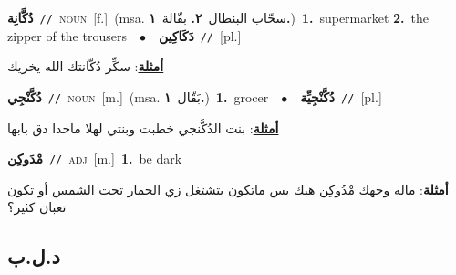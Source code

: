 \documentclass[10pt,a4paper,twoside]{article} %
\begin{document}
\begin{multicols}{2}
{\setlength\topsep{0pt}\textbf{\foreignlanguage{arabic}{دُكَّانِة}}\ {\color{gray}\texttt{//}\color{black}}\ \textsc{noun}\ [f.]\ \color{gray}(msa. \foreignlanguage{arabic}{سحّاب البنطال}~\foreignlanguage{arabic}{\textbf{٢.}}  \foreignlanguage{arabic}{بقّالة}~\foreignlanguage{arabic}{\textbf{١.}})\color{black}\ \textbf{1.}~supermarket  \textbf{2.}~the zipper of the trousers\ \ $\bullet$\ \ \setlength\topsep{0pt}\textbf{\foreignlanguage{arabic}{دَكَاكِين}}\ {\color{gray}\texttt{//}\color{black}}\ [pl.]\  \begin{flushright}\color{gray}\foreignlanguage{arabic}{\textbf{\underline{\foreignlanguage{arabic}{أمثلة}}}: سكِّر دُكّانتك الله يخزيك}\end{flushright}\color{black}} \vspace{2mm}

{\setlength\topsep{0pt}\textbf{\foreignlanguage{arabic}{دُكَّنْجِي}}\ {\color{gray}\texttt{//}\color{black}}\ \textsc{noun}\ [m.]\ \color{gray}(msa. \foreignlanguage{arabic}{بَقّال}~\foreignlanguage{arabic}{\textbf{١.}})\color{black}\ \textbf{1.}~grocer\ \ $\bullet$\ \ \setlength\topsep{0pt}\textbf{\foreignlanguage{arabic}{دُكَّنْجِيِّة}}\ {\color{gray}\texttt{//}\color{black}}\ [pl.]\  \begin{flushright}\color{gray}\foreignlanguage{arabic}{\textbf{\underline{\foreignlanguage{arabic}{أمثلة}}}: بنت الدُكَّنجي خطبت وبنتي لهلا ماحدا دق بابها}\end{flushright}\color{black}} \vspace{2mm}

{\setlength\topsep{0pt}\textbf{\foreignlanguage{arabic}{مْدَوكِن}}\ {\color{gray}\texttt{//}\color{black}}\ \textsc{adj}\ [m.]\ \textbf{1.}~be dark\  \begin{flushright}\color{gray}\foreignlanguage{arabic}{\textbf{\underline{\foreignlanguage{arabic}{أمثلة}}}: ماله وجهك مْدُوكِن هيك بس ماتكون بتشتغل زي الحمار تحت الشمس أو تكون تعبان كثير؟}\end{flushright}\color{black}} \vspace{2mm}

\vspace{-3mm}
\subsection*{\color{blue}\foreignlanguage{arabic}{د.ل.ب}\color{blue}{}} 


\end{multicols}
\end{document}
